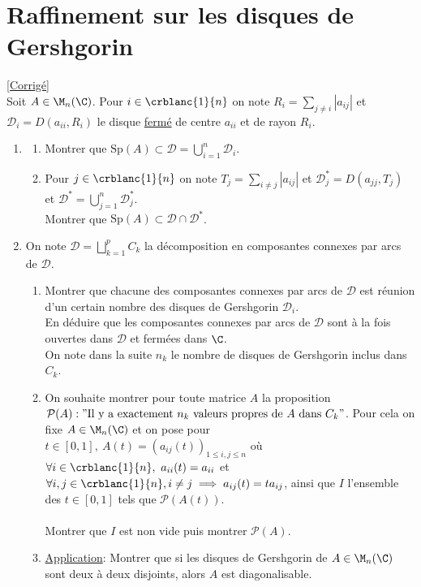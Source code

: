 \documentclass{book}
\begin{document}
\section{Raffinement sur les disques de Gershgorin}
\label{Raffinament sur les disques de Gershgorin}
\textcolor{blue}{\hyperref[sec:raffinement-sur-les-disques-de-gershgorin]{[Corrigé]}}\\
Soit $A\in \M_n(\C)$. Pour $i\in \crblanc{1}{n}$ on note $R_i=\sum\limits_{j\ne i}{|a_{ij}|}$ et $\mathcal{D}_i=D(a_{ii},R_i)$ le disque \underline{fermé} de centre $a_{ii}$ et de rayon $R_i$.
\begin{enumerate}
	\item \begin{enumerate}[label=\alph*.]
		\item Montrer que $\text{Sp}(A)\subset \mathcal{D}=\displaystyle\bigcup\limits_{i=1}^{n}{\mathcal{D}_i}$.
		\item Pour  $j\in \crblanc{1}{n}$ on note $T_j=\sum\limits_{i\ne j}{|a_{ij}|}$ et $\mathcal{D}_j^*=D(a_{jj},T_j)$ et $\mathcal{D}^*=\displaystyle\bigcup\limits_{j=1}^{n}{\mathcal{D}^*_j}$.\\
		Montrer que $\text{Sp}(A)\subset \mathcal{D}\cap \mathcal{D}^*$.
	\end{enumerate}
	\item On note $\mathcal{D}=\displaystyle\bigsqcup\limits_{k=1}^p{C_k}$ la décomposition en composantes connexes par arcs de $\mathcal{D}$.
	\begin{enumerate}[label=\alph*.]
		\item Montrer que chacune des composantes connexes par arcs de $\mathcal{D}$ est réunion d'un certain nombre des disques de Gershgorin $\mathcal{D}_i$.\\
		En déduire que les composantes connexes par arcs de $\mathcal{D}$ sont à la fois ouvertes dans $\mathcal{D}$ et fermées dans $\C$.\\
		On note dans la suite $n_k$ le nombre de disques de Gershgorin inclus dans $C_k$.
		\item On souhaite montrer pour toute matrice $A$ la proposition $\mathcal P(A):"\text{Il y a exactement $n_k$ valeurs propres de $A$ dans $C_k$}"$. Pour cela on fixe $A\in \M_n(\C)$ et on pose pour $t\in [0,1],\ A(t)=(a_{ij}(t))_{1\leq i,j\leq n}$ où $\forall i\in \crblanc{1}{n},\ a_{ii}(t)=a_{ii}$ et $\forall i,j\in \crblanc{1}{n}, i\ne j\implies a_{ij}(t)=ta_{ij}$, ainsi que $I$ l'ensemble des $t\in [0,1]$ tels que $\mathcal P(A(t))$.\\\\
		Montrer que $I$ est non vide puis montrer $\mathcal P(A)$.
		\item \underline{Application}: Montrer que si les disques de Gershgorin de $A\in \M_n(\C)$ sont deux à deux disjoints, alors $A$ est diagonalisable.
	\end{enumerate}
\end{enumerate}
\end{document}
